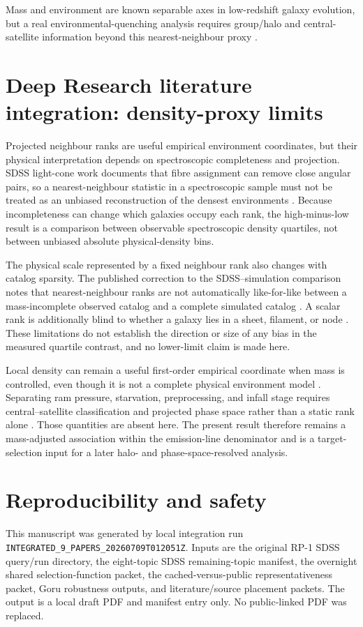 \documentclass[twocolumn]{aastex631}
\begin{document}
Mass and environment are known separable axes in low-redshift galaxy evolution, but a real environmental-quenching analysis requires group/halo and central-satellite information beyond this nearest-neighbour proxy \citep{peng2010,baldry2006,wetzel2013,goubert2024}.


\section{Deep Research literature integration: density-proxy limits}\label{sec:dr-r1}
Projected neighbour ranks are useful empirical environment coordinates, but their physical interpretation depends on spectroscopic completeness and projection. SDSS light-cone work documents that fibre assignment can remove close angular pairs, so a nearest-neighbour statistic in a spectroscopic sample must not be treated as an unbiased reconstruction of the densest environments \citep{dongpaez2024}. Because incompleteness can change which galaxies occupy each rank, the high-minus-low result is a comparison between observable spectroscopic density quartiles, not between unbiased absolute physical-density bins.

The physical scale represented by a fixed neighbour rank also changes with catalog sparsity. The published correction to the SDSS--simulation comparison notes that nearest-neighbour ranks are not automatically like-for-like between a mass-incomplete observed catalog and a complete simulated catalog \citep{goubert2024,goubert2024corr}. A scalar rank is additionally blind to whether a galaxy lies in a sheet, filament, or node \citep{nandi2025}. These limitations do not establish the direction or size of any bias in the measured quartile contrast, and no lower-limit claim is made here.

Local density can remain a useful first-order empirical coordinate when mass is controlled, even though it is not a complete physical environment model \citep{okane2024}. Separating ram pressure, starvation, preprocessing, and infall stage requires central--satellite classification and projected phase space rather than a static rank alone \citep{oxland2024,sampaio2024}. Those quantities are absent here. The present result therefore remains a mass-adjusted association within the emission-line denominator and is a target-selection input for a later halo- and phase-space-resolved analysis.

\section{Reproducibility and safety}\label{sec:repro}
This manuscript was generated by local integration run \texttt{INTEGRATED\_9\_PAPERS\_20260709T012051Z}. Inputs are the original RP-1 SDSS query/run directory, the eight-topic SDSS remaining-topic manifest, the overnight shared selection-function packet, the cached-versus-public representativeness packet, Goru robustness outputs, and literature/source placement packets. The output is a local draft PDF and manifest entry only. No public-linked PDF was replaced.
\end{document}

